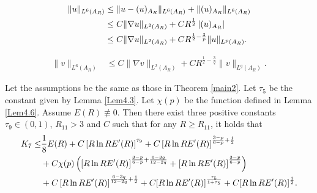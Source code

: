 \documentclass[10pt,a4paper]{amsart}
\begin{document}
	\begin{align}\label{ine4.19}
		\|u\|_{L^6(A_R)}&\leq \|u-(u)_{A_R}\|_{L^6(A_R)}+\|(u)_{A_R}\|_{L^6(A_R)}\notag\\
		&\leq C\|\nabla u\|_{L^2 (A_R)}+CR^\frac{1}{2}\left|(u)_{A_R}\right|\\
		&\leq C\|\nabla u\|_{L^2 (A_R)}+CR^{\frac{1}{2}-\frac{3}{p}}\|u\|_{L^p(A_R)}.\notag
	\end{align}

\begin{align}\label{ine4.30}
\|v\|_{L^6(A_R)}&\leq C\|\nabla v\|_{L^2 (A_R)}+CR^{\frac{1}{2}-\frac{3}{q}}\|v\|_{L^q(A_R)}.
\end{align}

\begin{Lem}\label{Lem4.9}
Let the assumptions be the same as those in {\rm Theorem \ref{main2}}. Let $\tau_5$ be  the constant given by  {\rm Lemma \ref{Lem4.3}}. Let $\chi(p)$ be the function defined in {\rm Lemma \ref{Lem4.6}}. Assume $E(R)\not\equiv0$. Then there exist three positive constants $\tau_9\in(0,1)$, $R_{11}>3$ and $C$ such that for any $R\geq R_{11}$, it holds that
\begin{align}\label{ine4.35}
K_7 \leq &\frac{1}{8} E(R)+C\left[R\ln RE'(R)\right]^{\tau_9}+C\left[R\ln RE'(R)\right]^{\frac{3-p}{6-p}+\frac{1}{2}}\notag\\
&+C\chi(p)\left(\left[R\ln RE'(R)\right]^{\frac{3-p}{6-p}+\frac{6-3q}{12-2q}}+\left[R\ln RE'(R)\right]^{\frac{3-p}{6-p}}\right)\\
&+C\left[R\ln RE'(R)\right]^{\frac{6-3q}{12-2q}+\frac{1}{2}}+C[R\ln RE'(R)]^\frac{\tau_5}{1+\tau_5}+C[R\ln RE'(R)]^\frac{1}{2}.\notag
\end{align}
\end{Lem}
\end{document}
